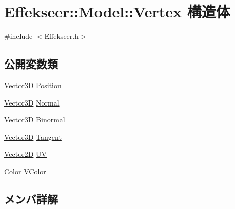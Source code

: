 \hypertarget{struct_effekseer_1_1_model_1_1_vertex}{}\section{Effekseer\+:\+:Model\+:\+:Vertex 構造体}
\label{struct_effekseer_1_1_model_1_1_vertex}


{\ttfamily \#include $<$Effekseer.\+h$>$}

\subsection*{公開変数類}
\begin{DoxyCompactItemize}
\item 
\mbox{\hyperlink{struct_effekseer_1_1_vector3_d}{Vector3D}} \mbox{\hyperlink{struct_effekseer_1_1_model_1_1_vertex_ab60ea714b94ff69deea1ce8c4ab5b2af}{Position}}
\item 
\mbox{\hyperlink{struct_effekseer_1_1_vector3_d}{Vector3D}} \mbox{\hyperlink{struct_effekseer_1_1_model_1_1_vertex_ad06ee8e47ca58d8da3ec6ba9aac1854e}{Normal}}
\item 
\mbox{\hyperlink{struct_effekseer_1_1_vector3_d}{Vector3D}} \mbox{\hyperlink{struct_effekseer_1_1_model_1_1_vertex_adc3b1c24c0a4ad31aa3baeeaeab77454}{Binormal}}
\item 
\mbox{\hyperlink{struct_effekseer_1_1_vector3_d}{Vector3D}} \mbox{\hyperlink{struct_effekseer_1_1_model_1_1_vertex_a5140b60278c5fb4b6d99afbf7966eb1a}{Tangent}}
\item 
\mbox{\hyperlink{struct_effekseer_1_1_vector2_d}{Vector2D}} \mbox{\hyperlink{struct_effekseer_1_1_model_1_1_vertex_a4b16f6ed12f2a67a6064728c7fe37d7f}{UV}}
\item 
\mbox{\hyperlink{struct_effekseer_1_1_color}{Color}} \mbox{\hyperlink{struct_effekseer_1_1_model_1_1_vertex_a41a843c2f7d16433de79a01837a91a7f}{V\+Color}}
\end{DoxyCompactItemize}


\subsection{メンバ詳解}
\mbox{\label{struct_effekseer_1_1_model_1_1_vertex_adc3b1c24c0a4ad31aa3baeeaeab77454}} 
